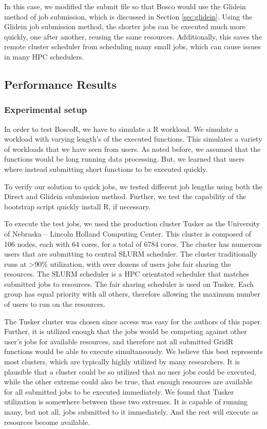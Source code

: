 \documentclass[conference]{IEEEtran}
\begin{document}
In this case, we modified the submit file so that Bosco would use the Glidein method of job submission, which is discussed in Section \ref{sec:glidein}.  Using the Glidein job submission method, the shorter jobs can be executed much more quickly, one after another, reusing the same resources.  Additionally, this saves the remote cluster scheduler from scheduling many small jobs, which can cause issues in many HPC schedulers.


\subsection{Performance Results}

\subsubsection{Experimental setup}  

In order to test BoscoR, we have to simulate a R workload.  We simulate a workload with varying length's of the executed functions.  This simulates a variety of workloads that we have seen from users.  As noted before, we assumed that the functions would be long running data processing.  But, we learned that users where instead submitting short functions to be executed quickly.  

To verify our solution to quick jobs, we tested different job lengths using both the Direct and Glidein submission method.  Further, we test the capability of the bootstrap script quickly install R, if necessary.

To execute the test jobs, we used the production cluster Tusker as the University of Nebraska -- Lincoln Holland Computing Center.  This cluster is composed of 106 nodes, each with 64 cores, for a total of 6784 cores.  The cluster has numerous users that are submitting to central SLURM \cite{yoo2003slurm} scheduler.  The cluster traditionally runs at >90\% utilization, with over dozens of users jobs fair sharing the resources.  The SLURM scheduler is a HPC orientated scheduler that matches submitted jobs to resources.  The fair sharing scheduler is used on Tusker.  Each group has equal priority with all others, therefore allowing the maximum number of users to run on the resources.

The Tusker cluster was chosen since access was easy for the authors of this paper.  Further, it is utilized enough that the jobs would be competing against other user's jobs for available resources, and therefore not all submitted GridR functions would be able to execute simultaneously.  We believe this best represents most clusters, which are typically highly utilized by many researchers.  It is plausible that a cluster could be so utilized that no user jobs could be executed, while the other extreme could also be true, that enough resources are available for all submitted jobs to be executed immediately.  We found that Tusker utilization is somewhere between these two extremes.  It is capable of running many, but not all, jobs submitted to it immediately.  And the rest will execute as resources become available.
\end{document}
